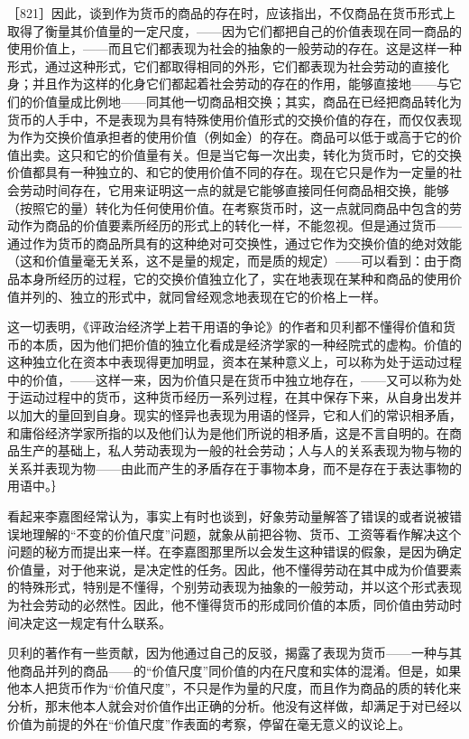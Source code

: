 ［821］因此，谈到作为货币的商品的存在时，应该指出，不仅商品在货币形式上取得了衡量其价值量的一定尺度，——因为它们都把自己的价值表现在同一商品的使用价值上，——而且它们都表现为社会的抽象的一般劳动的存在。这是这样一种形式，通过这种形式，它们都取得相同的外形，它们都表现为社会劳动的直接化身；并且作为这样的化身它们都起着社会劳动的存在的作用，能够直接地——与它们的价值量成比例地——同其他一切商品相交换；其实，商品在已经把商品转化为货币的人手中，不是表现为具有特殊使用价值形式的交换价值的存在，而仅仅表现为作为交换价值承担者的使用价值（例如金）的存在。商品可以低于或高于它的价值出卖。这只和它的价值量有关。但是当它每一次出卖，转化为货币时，它的交换价值都具有一种独立的、和它的使用价值不同的存在。现在它只是作为一定量的社会劳动时间存在，它用来证明这一点的就是它能够直接同任何商品相交换，能够（按照它的量）转化为任何使用价值。在考察货币时，这一点就同商品中包含的劳动作为商品的价值要素所经历的形式上的转化一样，不能忽视。但是通过货币——通过作为货币的商品所具有的这种绝对可交换性，通过它作为交换价值的绝对效能（这和价值量毫无关系，这不是量的规定，而是质的规定）——可以看到：由于商品本身所经历的过程，它的交换价值独立化了，实在地表现在某种和商品的使用价值并列的、独立的形式中，就同曾经观念地表现在它的价格上一样。

这一切表明，《评政治经济学上若干用语的争论》的作者和贝利都不懂得价值和货币的本质，因为他们把价值的独立化看成是经济学家的一种经院式的虚构。价值的这种独立化在资本中表现得更加明显，资本在某种意义上，可以称为处于运动过程中的价值，——这样一来，因为价值只是在货币中独立地存在，——又可以称为处于运动过程中的货币，这种货币经历一系列过程，在其中保存下来，从自身出发并以加大的量回到自身。现实的怪异也表现为用语的怪异，它和人们的常识相矛盾，和庸俗经济学家所指的以及他们认为是他们所说的相矛盾，这是不言自明的。在商品生产的基础上，私人劳动表现为一般的社会劳动；人与人的关系表现为物与物的关系并表现为物——由此而产生的矛盾存在于事物本身，而不是存在于表达事物的用语中。｝

看起来李嘉图经常认为，事实上有时也谈到，好象劳动量解答了错误的或者说被错误地理解的“不变的价值尺度”问题，就象从前把谷物、货币、工资等看作解决这个问题的秘方而提出来一样。在李嘉图那里所以会发生这种错误的假象，是因为确定价值量，对于他来说，是决定性的任务。因此，他不懂得劳动在其中成为价值要素的特殊形式，特别是不懂得，个别劳动表现为抽象的一般劳动，并以这个形式表现为社会劳动的必然性。因此，他不懂得货币的形成同价值的本质，同价值由劳动时间决定这一规定有什么联系。

贝利的著作有一些贡献，因为他通过自己的反驳，揭露了表现为货币——一种与其他商品并列的商品——的“价值尺度”同价值的内在尺度和实体的混淆。但是，如果他本人把货币作为“价值尺度”，不只是作为量的尺度，而且作为商品的质的转化来分析，那末他本人就会对价值作出正确的分析。他没有这样做，却满足于对已经以价值为前提的外在“价值尺度”作表面的考察，停留在毫无意义的议论上。


